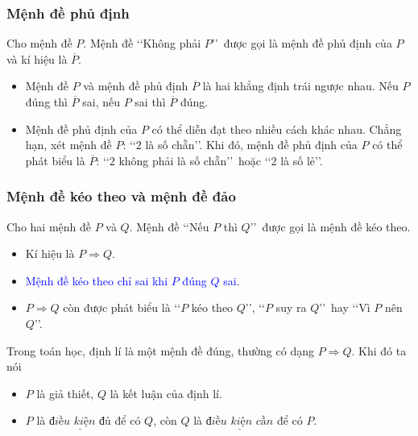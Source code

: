 \begin{tomtat}
\subsubsection{Mệnh đề phủ định}

\begin{boxdn}{}
	Cho mệnh đề $P$. Mệnh đề \lq\lq  Không phải $P$\rq\rq\ được gọi là mệnh đề phủ định của $P$ và kí hiệu là $\overline{P}$.
	\begin{itemize}
		\item Mệnh đề $P$ và mệnh đề phủ định $\overline{P}$ là hai khẳng định trái ngược nhau. Nếu $P$ đúng thì $\overline{P}$ sai, nếu $P$ sai thì $\overline{P}$ đúng.
		\item Mệnh đề phủ định của $P$ có thể diễn đạt theo nhiều cách khác nhau. Chẳng hạn, xét mệnh đề $P$: \lq\lq  $2$ là số chẵn\rq\rq. Khi đó, mệnh đề phủ định của $P$ có thể phát biểu là $\overline{P}$: \lq\lq  $2$ không phải là số chẵn\rq\rq\ hoặc \lq\lq  $2$ là số lẻ\rq\rq.
	\end{itemize} 
\end{boxdn}

\subsubsection{Mệnh đề kéo theo và mệnh đề đảo}

\begin{boxdn}{}
	Cho hai mệnh đề $P$ và $Q$. Mệnh đề \lq\lq  Nếu $P$ thì $Q$\rq\rq\ được gọi là mệnh đề kéo theo.
	\begin{itemize}
		\item Kí hiệu là $P\Rightarrow Q.$
		\item \textcolor{blue}{Mệnh đề kéo theo chỉ sai khi $P$ đúng $Q$ sai}.
		\item $P\Rightarrow Q$ còn được phát biểu là \lq\lq  $P$ kéo theo $Q$\rq\rq, \lq\lq  $P$ suy ra $Q$\rq\rq\ hay \lq\lq  Vì $P$ nên $Q$\rq\rq.
	\end{itemize}
\end{boxdn}

\begin{note}
	Trong toán học, định lí là một mệnh đề đúng, thường có dạng $P\Rightarrow Q$.
	Khi đó ta nói 
	\begin{itemize}
		\item $P$ là giả thiết, $Q$ là kết luận của định lí.
		\item $P$ là $\underline{\textit{điều kiện đủ}}$ để có $Q$, còn $Q$ là $\underline{\textit{điều kiện cần}}$ để có $P$.
	\end{itemize}
\end{note}


\end{tomtat}
